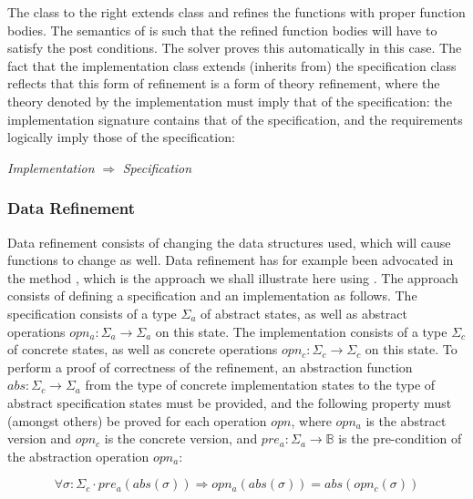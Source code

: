 The class 
to the right extends class  and refines the functions with
proper function bodies. The semantics of \Klang{} is such that the refined function 
bodies will have to satisfy the post conditions. The \Klang{} solver proves this
automatically in this case. The fact that the implementation class extends 
(inherits from) the specification class reflects that this form of refinement is a 
form of theory refinement, where the theory denoted by the implementation must imply 
that of the specification: the implementation signature contains that of the 
specification, and the requirements logically imply those of the specification:

\begin{center}
{\em Implementation} $\Rightarrow$ {\em Specification}
\end{center}

\subsubsection{Data Refinement}

Data refinement consists of changing the data structures used, which will
cause functions to change as well. Data refinement has for example been
advocated in the \vdm{} method 
\cite{vdm78,bjoerner-jones-82,jones90}, which is the approach we shall
illustrate here using \Klang. The approach consists of defining a specification 
and an implementation as follows. The specification consists of a type
$\Sigma_a$ of abstract states, as well as abstract operations $opn_a : \Sigma_a 
\rightarrow \Sigma_a$ on this state. The implementation consists of a type
$\Sigma_c$ of concrete states, as well as concrete operations $opn_c : \Sigma_c 
\rightarrow \Sigma_c$ on this state. To perform a proof of correctness of the 
refinement, an abstraction function $abs : \Sigma_c \rightarrow \Sigma_a$ from 
the type of concrete implementation states to the type of abstract specification 
states must be provided, and the following property must (amongst others) 
be proved for each operation $opn$, where $opn_a$ is the abstract version and $opn_c$ is the concrete version, and $pre_a : \Sigma_a \rightarrow \mathbb{B}$
is the pre-condition of the abstraction operation $opn_a$:

\begin{equation} \label{eq:refinement}
\forall \sigma : \Sigma_c \cdot 
  pre_a(abs(\sigma)) \Rightarrow opn_a(abs(\sigma)) = abs(opn_c(\sigma))
\end{equation}

